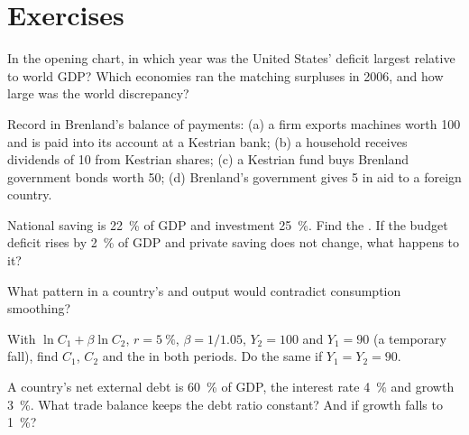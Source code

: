\section{Exercises}\label{sec:b3:current-account:exercises}

\begin{exercise}[$\star$]\label{exo:b3:current-account:1}
In the opening chart, in which year was the United States' deficit largest
relative to world GDP? Which economies ran the matching surpluses in 2006, and how
large was the world discrepancy?
\end{exercise}

\begin{exercise}[$\star$]\label{exo:b3:current-account:2}
Record in Brenland's balance of payments: (a) a firm exports machines worth 100 and is
paid into its account at a Kestrian bank; (b) a household receives dividends of 10
from Kestrian shares; (c) a Kestrian fund buys Brenland government bonds worth 50;
(d) Brenland's government gives 5 in aid to a foreign country.
\end{exercise}

\begin{exercise}[$\star$]\label{exo:b3:current-account:3}
National saving is 22~\% of GDP and investment 25~\%. Find the . If the
budget deficit rises by 2~\% of GDP and private saving does not change, what happens
to it?
\end{exercise}

\begin{exercise}[$\star$]\label{exo:b3:current-account:4}
What pattern in a country's  and output would contradict
consumption smoothing?
\end{exercise}

\begin{exercise}[$\star\star$]\label{exo:b3:current-account:5}
With $\ln C_1 + \beta\ln C_2$, $r = 5~\%$, $\beta = 1/1.05$, $Y_2 = 100$ and $Y_1 = 90$ (a temporary fall),
find $C_1$, $C_2$ and the  in both periods. Do the same if $Y_1 = Y_2 = 90$.
\end{exercise}

\begin{exercise}[$\star\star$]\label{exo:b3:current-account:6}
A country's net external debt is 60~\% of GDP, the interest rate 4~\% and growth 3~\%.
What trade balance keeps the debt ratio constant? And if growth falls to 1~\%?
\end{exercise}

